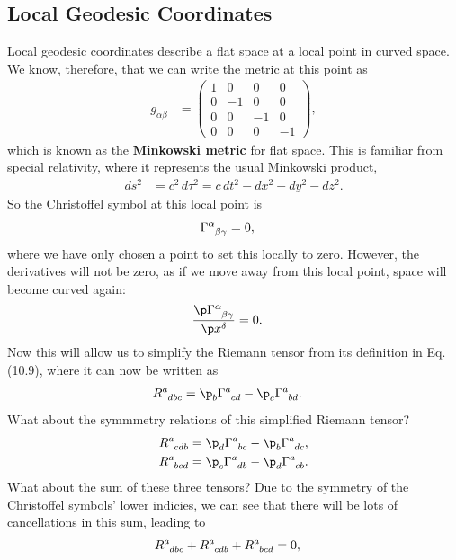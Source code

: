 \documentclass[a4paper, 11pt, normalem]{report}
\begin{document}
\subsection{Local Geodesic Coordinates}
Local geodesic coordinates describe a flat space at a local point in curved space.
We know, therefore, that we can write the metric at this point as
\begin{align}
    g_{\alpha\beta} &= \begin{pmatrix} 1 & 0 & 0 & 0 \\ 0 & -1 & 0 & 0 \\ 0 & 0 & -1 & 0 \\ 0 & 0 & 0 & -1 \end{pmatrix},
\end{align}
which is known as the \textbf{Minkowski metric} for flat space. 
This is familiar from special relativity, where it represents the usual Minkowski product,
\begin{align}
    ds^2 &= c^2\,d\tau^2 = c\,dt^2 - dx^2 - dy^2 - dz^2.
\end{align}
So the Christoffel symbol at this local point is
\begin{align}
    \tensor{\Gamma}{^\alpha_{\beta\gamma}} &= 0,
\end{align} 
where we have only chosen a point to set this locally to zero. 
However, the derivatives will not be zero, as if we move away from this local point, space will become curved again:
\begin{align}
    \frac{\p\tensor{\Gamma}{^\alpha_{\beta\gamma}}}{\p x^\delta} &= 0.
\end{align}
Now this will allow us to simplify the Riemann tensor from its definition in Eq. (10.9), where it can now be written as
\begin{align}
    \tensor{R}{^a_{dbc}} &= \p_b\tensor{\Gamma}{^a_{cd}} - \p_c\tensor{\Gamma}{^a_{bd}}.
\end{align}
What about the symmmetry relations of this simplified Riemann tensor?
\begin{align}
    \tensor{R}{^a_{cdb}} &= \p_d\tensor{\Gamma}{^a_{bc}} - \p_b\tensor{\Gamma}{^a_{dc}}, \\
    \tensor{R}{^a_{bcd}} &= \p_c\tensor{\Gamma}{^a_{db}} - \p_d\tensor{\Gamma}{^a_{cb}}. 
\end{align}
What about the sum of these three tensors?
Due to the symmetry of the Christoffel symbols' lower indicies, we can see that there will be lots of cancellations in this sum, leading to
\begin{align}
    \tensor{R}{^a_{dbc}} + \tensor{R}{^a_{cdb}} + \tensor{R}{^a_{bcd}} &= 0,
\end{align}
\end{document}
